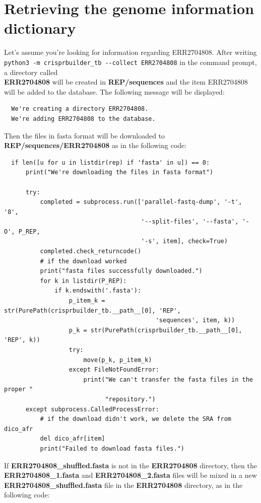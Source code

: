 \documentclass[twoside,a4paper,11pt,frenchb,openany]{report}
\begin{document}
    \section{Retrieving the genome information
dictionary}\label{retrieving-the-genome-information-dictionary}

    Let's assume you're looking for information regarding ERR2704808. After
writing \texttt{python3\ -m\ crisprbuilder\_tb\ -\/-collect\ ERR2704808}
in the command prompt, a directory called\\ \textbf{ERR2704808} will be
created in \textbf{REP/sequences} and the item ERR2704808 will be added
to the database. The following message will be displayed:

    \begin{verbatim}
  We're creating a directory ERR2704808.
  We're adding ERR2704808 to the database.
\end{verbatim}

    Then the files in fasta format will be downloaded to
\textbf{REP/sequences/ERR2704808} as in the following code:

\begin{verbatim}
  if len([u for u in listdir(rep) if 'fasta' in u]) == 0:
      print("We're downloading the files in fasta format")

      try:
          completed = subprocess.run(['parallel-fastq-dump', '-t', '8',
                                      '--split-files', '--fasta', '-O', P_REP,
                                      '-s', item], check=True)
          completed.check_returncode()
          # if the download worked
          print("fasta files successfully downloaded.")
          for k in listdir(P_REP):
              if k.endswith('.fasta'):
                  p_item_k = str(PurePath(crisprbuilder_tb.__path__[0], 'REP',
                                          'sequences', item, k))
                  p_k = str(PurePath(crisprbuilder_tb.__path__[0], 'REP', k))
                  try:
                      move(p_k, p_item_k)
                  except FileNotFoundError:
                      print("We can't transfer the fasta files in the proper "
                            "repository.")
      except subprocess.CalledProcessError:
          # if the download didn't work, we delete the SRA from dico_afr
          del dico_afr[item]
          print("Failed to download fasta files.")
\end{verbatim}

    If \textbf{ERR2704808\_shuffled.fasta} is not in the \textbf{ERR2704808}
directory, then the\\ \textbf{ERR2704808\_1.fasta} and \textbf{ERR2704808\_2.fasta} files
will be mixed in a new\\ \textbf{ERR2704808\_shuffled.fasta} file in the
\textbf{ERR2704808} directory, as in the following code:
\end{document}
